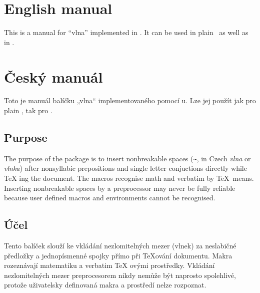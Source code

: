 
\ifeng

\section{English manual}
This is a manual for “vlna” implemented in \XeTeX. It can be used in plain \XeTeX\ as well as in
\XeLaTeX.

\else

\section{\texorpdfstring{Český manuál}{Cesky manual}}
Toto je manuál balíčku „vlna“ implementovaného pomocí \XeTeX u. Lze jej použít jak pro plain
\XeTeX, tak pro \XeLaTeX.

\fi


\ifeng

\subsection{Purpose}
The purpose of the package is to insert nonbreakable spaces (\verb:~:, in Czech \textit{vlna} or
\textit{vlnka}) after nonsyllabic prepositions and single letter conjuctions directly while \TeX
ing the document. The macros recognise math and verbatim by \TeX\ means. Inserting nonbreakable
spaces by a preprocessor may never be fully reliable because user defined macros and environments
cannot be recognised.

\else

\subsection{Účel}
Tento balíček slouží ke vkládání nezlomitelných mezer (vlnek) za neslabičné předložky a
jednopísmenné spojky přímo při \TeX ování dokumentu. Makra rozeznávají matematiku a verbatim \TeX
ovými prostředky. Vkládání nezlomitelných mezer preprocesorem nikdy nemůže být naprosto
spolehlivé, protože uživatelsky definovaná makra a prostředí nelze rozpoznat.

\fi


\ifeng

